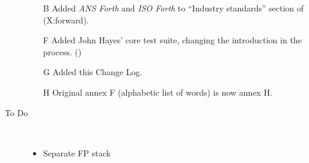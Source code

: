 \begin{description}
\begin{itemize}
	\item[B] Added \emph{ANS Forth} and \emph{ISO Forth} to
		``Industry standards'' section of 
		(\textsf{X:forward}).

	\item[F] Added John Hayes' core test suite, changing the
		introduction in the process. ()
	\item[G] Added this Change Log.
	\item[H] Original annex F (alphabetic list of words) is now
		annex H.
	\end{itemize}

\item[To Do] ~\\
	\begin{itemize}
	\item Separate FP stack
	\end{itemize}

\end{description}
